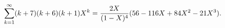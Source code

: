 \begin{equation}
\sum_{k=1}^{\infty}(k+7)(k+6)(k+1)X^{k} ={2X\over
(1-X)^{4}}(56-116X+84X^{2}-21X^{3}).
\end{equation}

